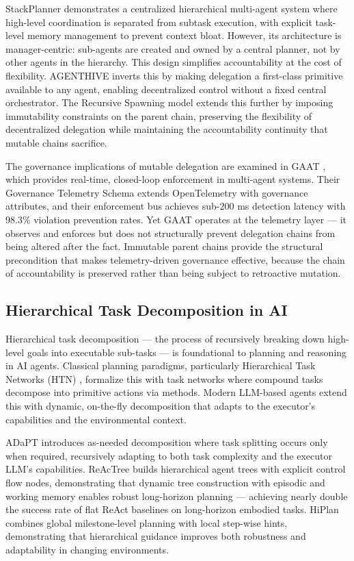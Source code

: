 StackPlanner \cite{stackplanner} demonstrates a centralized hierarchical multi-agent system where high-level coordination is separated from subtask execution, with explicit task-level memory management to prevent context bloat. However, its architecture is manager-centric: sub-agents are created and owned by a central planner, not by other agents in the hierarchy. This design simplifies accountability at the cost of flexibility. AGENTHIVE \cite{agenthive} inverts this by making delegation a first-class primitive available to any agent, enabling decentralized control without a fixed central orchestrator. The Recursive Spawning model extends this further by imposing immutability constraints on the parent chain, preserving the flexibility of decentralized delegation while maintaining the accountability continuity that mutable chains sacrifice.

The governance implications of mutable delegation are examined in GAAT \cite{gaat}, which provides real-time, closed-loop enforcement in multi-agent systems. Their Governance Telemetry Schema extends OpenTelemetry with governance attributes, and their enforcement bus achieves sub-200 ms detection latency with 98.3\% violation prevention rates. Yet GAAT operates at the telemetry layer — it observes and enforces but does not structurally prevent delegation chains from being altered after the fact. Immutable parent chains provide the structural precondition that makes telemetry-driven governance effective, because the chain of accountability is preserved rather than being subject to retroactive mutation.

\subsection{Hierarchical Task Decomposition in AI}

Hierarchical task decomposition — the process of recursively breaking down high-level goals into executable sub-tasks — is foundational to planning and reasoning in AI agents. Classical planning paradigms, particularly Hierarchical Task Networks (HTN) \cite{htn}, formalize this with task networks where compound tasks decompose into primitive actions via methods. Modern LLM-based agents extend this with dynamic, on-the-fly decomposition that adapts to the executor's capabilities and the environmental context.

ADaPT \cite{adapt} introduces as-needed decomposition where task splitting occurs only when required, recursively adapting to both task complexity and the executor LLM's capabilities. ReAcTree \cite{reactree} builds hierarchical agent trees with explicit control flow nodes, demonstrating that dynamic tree construction with episodic and working memory enables robust long-horizon planning — achieving nearly double the success rate of flat ReAct baselines on long-horizon embodied tasks. HiPlan \cite{hiplan} combines global milestone-level planning with local step-wise hints, demonstrating that hierarchical guidance improves both robustness and adaptability in changing environments.

